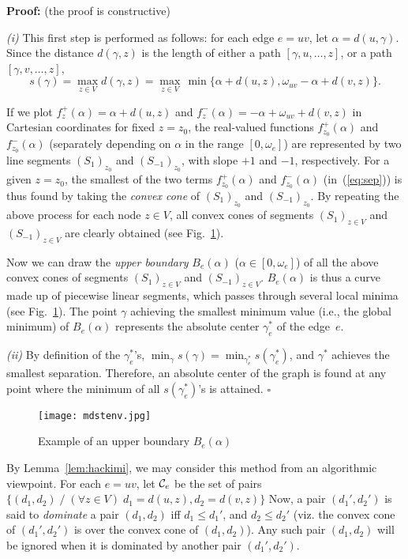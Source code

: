 \documentclass[10pt]{article}
\newenvironment{proof}{\begin{trivlist}
                       \item[]\hspace{0cm}\textbf{Proof: }
                       \hspace{0cm} }{\hfill $\square$
                       \end{trivlist}}
\begin{document}
\begin{proof}(the proof is constructive)

{\em (i)} This first step is performed as follows: for each edge $e=uv$, let
$\alpha = d(u,\gamma)$. Since the distance $d(\gamma,z)$ is the length
of either a path $[\gamma,u,\ldots ,z]$, or a path $[\gamma,v,\ldots ,z]$,
\begin{equation}
s(\gamma)=\max_{z\in V} d(\gamma,z)=\max_{z\in V}\,\min\{\alpha+d(u,z),
\omega_{uv}-\alpha+d(v,z)\}. \label{eq:sep}
\end{equation}

If we plot $f_{z}^+(\alpha)=\alpha+d(u,z)$ and $f_{z}^-(\alpha)=-\alpha +
\omega_{uv}+d(v,z)$ in Cartesian coordinates for fixed $z=z_0$, the
real-valued functions $f_{z_0}^+(\alpha)$ and $f_{z_0}^-(\alpha)$
(separately depending on $\alpha$ in the range $[0,\omega_e]$) are
represented by two line segments $(S_1)_{z_0}$ and $(S_{-1})_{z_0}$,
with slope $+1$ and $-1$, respectively. For a given $z=z_0$, the
smallest of the two terms $f_{z_0}^+(\alpha)$ and $f_{z_0}^-(\alpha)$
(in~(\ref{eq:sep})) is thus found by taking the {\em convex cone} of
$(S_1)_{z_0}$ and $(S_{-1})_{z_0}$. By repeating the above process for
each node $z \in V$, all convex cones of segments $(S_1)_{z \in V}$
and $(S_{-1})_{z \in V}$ are clearly obtained (see
Fig.~\ref{fig:bound}).

Now we can draw the {\em upper boundary} $B_e (\alpha)$ ($\alpha\in
[0,\omega_e]$) of all the above convex cones of segments $(S_1)_{z\in
V}$ and $(S_{-1})_{z \in V}$. $B_e (\alpha)$ is thus a curve made up
of piecewise linear segments, which passes through several local
minima (see Fig.~\ref{fig:bound}). The point $\gamma$ achieving the
smallest minimum value (i.e., the global minimum) of $B_e (\alpha)$
represents the absolute center $\gamma^*_e$ of the edge~$e$.

\medskip
{\em (ii)} By definition of the $\gamma^*_e$'s, $\min_\gamma s(\gamma) =
\min_{\gamma^*_e}s(\gamma^*_e)$, and $\gamma^*$ achieves the
smallest separation. Therefore, an absolute center of the graph is found
at any point where the minimum of all $s(\gamma^*_e)$'s is attained.
\end{proof}

\begin{figure}[htb]
\centering
\texttt{[image: mdstenv.jpg]}
\caption{Example of an upper boundary $B_e (\alpha)$}
\label{fig:bound}
\end{figure}

By Lemma~\ref{lem:hackimi}, we may consider this method from an
algorithmic viewpoint. For each $e=uv$, let ${\cal C}_e$ be the set of
pairs $\{(d_1,d_2) \; / \; (\forall z \in V) \; d_1=d(u,z),
d_2=d(v,z)\}$ Now, a pair $(d_1',d_2')$ is said to {\em dominate} a
pair $(d_1,d_2)$ iff $d_1\leq d_1'$, and $d_2\leq d_2'$ (viz. the
convex cone of $(d_1',d_2')$ is over the convex cone of $(d_1,d_2)$).
Any such pair $(d_1,d_2)$ will be ignored when it is dominated by
another pair $(d_1',d_2')$.
\end{document}
